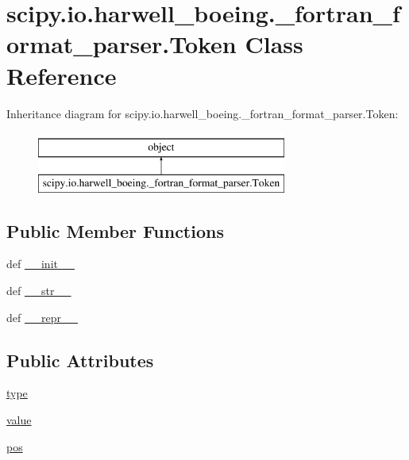 \hypertarget{classscipy_1_1io_1_1harwell__boeing_1_1__fortran__format__parser_1_1Token}{}\section{scipy.\+io.\+harwell\+\_\+boeing.\+\_\+fortran\+\_\+format\+\_\+parser.\+Token Class Reference}
\label{classscipy_1_1io_1_1harwell__boeing_1_1__fortran__format__parser_1_1Token}
Inheritance diagram for scipy.\+io.\+harwell\+\_\+boeing.\+\_\+fortran\+\_\+format\+\_\+parser.\+Token\+:\begin{figure}[H]
\begin{center}
\leavevmode
\includegraphics[height=2.000000cm]{classscipy_1_1io_1_1harwell__boeing_1_1__fortran__format__parser_1_1Token}
\end{center}
\end{figure}
\subsection*{Public Member Functions}
\begin{DoxyCompactItemize}
\item 
def \hyperlink{classscipy_1_1io_1_1harwell__boeing_1_1__fortran__format__parser_1_1Token_a0f27ff7e966f33a4192a9600bdafb813}{\+\_\+\+\_\+init\+\_\+\+\_\+}
\item 
def \hyperlink{classscipy_1_1io_1_1harwell__boeing_1_1__fortran__format__parser_1_1Token_aced2d15e6f78920d3e7a50d57770748c}{\+\_\+\+\_\+str\+\_\+\+\_\+}
\item 
def \hyperlink{classscipy_1_1io_1_1harwell__boeing_1_1__fortran__format__parser_1_1Token_a3c4ec2731d530d17d552df25b75a5914}{\+\_\+\+\_\+repr\+\_\+\+\_\+}
\end{DoxyCompactItemize}
\subsection*{Public Attributes}
\begin{DoxyCompactItemize}
\item 
\hyperlink{classscipy_1_1io_1_1harwell__boeing_1_1__fortran__format__parser_1_1Token_a40e88c474d6f2e754ada29327116e40a}{type}
\item 
\hyperlink{classscipy_1_1io_1_1harwell__boeing_1_1__fortran__format__parser_1_1Token_a6785aa6fb6aeb32287b7796d31ea514b}{value}
\item 
\hyperlink{classscipy_1_1io_1_1harwell__boeing_1_1__fortran__format__parser_1_1Token_ac541cd20b6f5c3c0e0ab08dabcbe00f3}{pos}
\end{DoxyCompactItemize}


